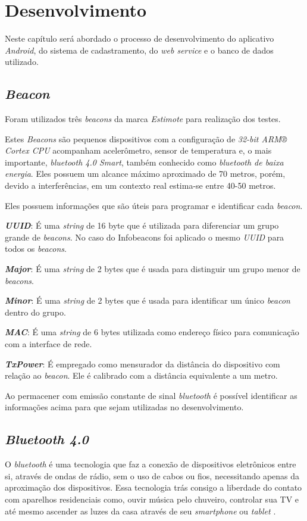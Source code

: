 \chapter{Desenvolvimento}
Neste capítulo será abordado o processo de desenvolvimento do aplicativo \textit{Android}, do sistema de cadastramento, do \textit{web service} e o banco de dados utilizado.

\section{\textit{Beacon}}
Foram utilizados três \textit{beacons} da marca \textit{Estimote} para realização dos testes.

Estes \textit{Beacons} são pequenos dispositivos com a configuração de \textit{32-bit ARM® Cortex CPU} acompanham acelerômetro, sensor de temperatura e, o mais importante, \textit{bluetooth 4.0 Smart}, também conhecido como \textit{bluetooth de baixa energia}. Eles possuem um alcance máximo aproximado de 70 metros, porém, devido a interferências, em um contexto real estima-se entre 40-50 metros.\cite{estimote}

Eles possuem informações que são úteis para programar e identificar cada \textit{beacon}.

\textbf{\textit{UUID}}: É uma \textit{string} de 16 byte que é utilizada para diferenciar um grupo grande de \textit{beacons}. No caso do Infobeacons foi aplicado o mesmo \textit{UUID} para todos os \textit{beacons}.

\textbf{\textit{Major}}: É uma \textit{string} de 2 bytes que é usada para distinguir um grupo menor de \textit{beacons}.

\textbf{\textit{Minor}}: É uma \textit{string} de 2 bytes que é usada para identificar um único \textit{beacon} dentro do grupo.

\textbf{\textit{MAC}}: É uma \textit{string} de 6 bytes utilizada como endereço físico para comunicação com a interface de rede.

\textbf{\textit{TxPower}}: É empregado como mensurador da distância do dispositivo com relação ao \textit{beacon}. Ele é calibrado com a distância equivalente a um metro.

Ao permacener com emissão constante de sinal \textit{bluetooth} é possível identificar as informações acima para que sejam utilizadas no desenvolvimento.

\section{\textit{Bluetooth 4.0}}
O \textit{bluetooth} é uma tecnologia que faz a conexão de dispositivos eletrônicos entre si, através de ondas de rádio, sem o uso de cabos ou fios, necessitando apenas da aproximação dos dispositivos. Essa tecnologia trás consigo a liberdade do contato com aparelhos residenciais como, ouvir música pelo chuveiro, controlar sua TV e até mesmo ascender as luzes da casa através de seu \textit{smartphone} ou \textit{tablet} \cite{bluetooth}.

